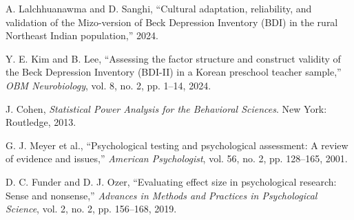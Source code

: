 \documentclass[conference]{IEEEtran}
\begin{document}
\begin{thebibliography}{00}
 A. Lalchhuanawma and D. Sanghi, ``Cultural adaptation, reliability, and validation of the Mizo-version of Beck Depression Inventory (BDI) in the rural Northeast Indian population,'' 2024.

 Y. E. Kim and B. Lee, ``Assessing the factor structure and construct validity of the Beck Depression Inventory (BDI-II) in a Korean preschool teacher sample,'' \textit{OBM Neurobiology}, vol. 8, no. 2, pp. 1–14, 2024.

 J. Cohen, \textit{Statistical Power Analysis for the Behavioral Sciences}. New York: Routledge, 2013.

 G. J. Meyer et al., ``Psychological testing and psychological assessment: A review of evidence and issues,'' \textit{American Psychologist}, vol. 56, no. 2, pp. 128–165, 2001.

 D. C. Funder and D. J. Ozer, ``Evaluating effect size in psychological research: Sense and nonsense,'' \textit{Advances in Methods and Practices in Psychological Science}, vol. 2, no. 2, pp. 156–168, 2019.

\end{thebibliography}
\end{document}
